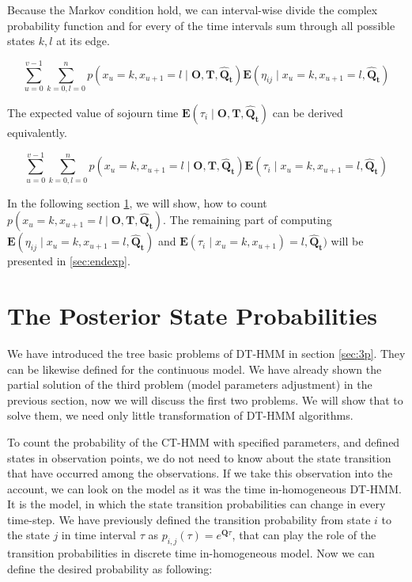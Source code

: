 \documentclass[thesis=M,english]{FITthesis}[2012/10/20]
\newcommand{\matr}[1]{\mathbf{#1}}
\begin{document}
Because the Markov condition hold, we can interval-wise divide the complex probability function and for every of the time intervals sum through all possible states $k,l$ at its edge. 

\begin{equation}
\sum_{u=0}^{v-1} \sum_{k=0,l=0}^n p( x_u = k, x_{u+1} = l \mid \matr{O},\matr{T}, \matr{ \hat Q_t }) \mathbf{E}(\eta_{ij} \mid x_u = k, x_{u+1} = l, \matr{ \hat Q_t } )
\end{equation}

The expected value of sojourn time $\mathbf{E}( \tau_i \mid \matr{O},\matr{T}, \matr{ \hat Q_t } )$ can be derived equivalently.

\begin{equation}
\sum_{u=0}^{v-1} \sum_{k=0,l=0}^n p( x_u = k, x_{u+1} = l \mid \matr{O},\matr{T}, \matr{ \hat Q_t }) \mathbf{E}(\tau_i \mid x_u = k, x_{u+1} = l,\matr{\hat Q_t} )
\end{equation}

In the following section \ref{sec:pos}, we will show, how to count $p(x_u = k,x_{u+1} = l \mid \matr{O},\matr{T}, \matr{ \hat Q_t })$. The remaining part of computing $\mathbf{E}(\eta_{ij} \mid x_u = k, x_{u+1} = l,\matr{\hat Q_t} )$ and $\mathbf{E}(\tau_i \mid x_u = k, x_{u+1}) = l, \matr{ \hat Q_t } )$ will be presented in \ref{sec:endexp}. 

\section{The Posterior State Probabilities}\label{sec:pos}

We have introduced the tree basic problems of DT-HMM in section \ref{sec:3p}. They can be likewise defined for the continuous model. We have already shown the partial solution of the third problem (model parameters adjustment) in the previous section, now we will discuss the first two problems. We will show that to solve them, we need only little transformation of DT-HMM algorithms.

To count the probability of the CT-HMM with specified parameters, and defined states in observation points, we do not need to know about the state transition that have occurred among the observations.
If we take this observation into the account, we can look on the model as it was the time in-homogeneous DT-HMM. It is the model, in which the state transition probabilities can change in every time-step. We have previously defined the transition probability from state $i$ to the state $j$ in time interval $\tau$ as $p_{i,j}( \tau ) = e^{ \matr{Q} \tau}$, that can play the role of the transition probabilities in discrete time in-homogeneous model. Now we can define the desired probability as following:
\end{document}
